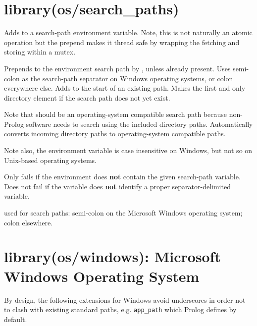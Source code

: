 \chapter{library(os/search_paths)}\label{sec:searchpaths}

\begin{description}
Adds  to a search-path environment variable. Note, this is
not naturally an atomic operation but the prepend makes it thread
safe by wrapping the fetching and storing within a mutex.

Prepends  to the environment search path by , unless
already present. Uses semi-colon as the search-path separator on
Windows operating systems, or colon everywhere else. Adds 
to the start of an existing path. Makes  the first and only
directory element if the search path does not yet exist.

Note that  should be an operating-system compatible search
path because non-Prolog software needs to search using the included
directory paths. Automatically converts incoming directory paths to
operating-system compatible paths.

Note also, the environment variable  is case insensitive on
Windows, but not so on Unix-based operating systems.

\nodescription
Only fails if the environment does \textbf{not} contain the given
search-path variable. Does not fail if the variable does \textbf{not}
identify a proper separator-delimited variable.

 used for search paths: semi-colon on the Microsoft Windows
operating system; colon elsewhere.
\end{description}

\chapter{library(os/windows): Microsoft Windows Operating System}\label{sec:windows}

By design, the following extensions for Windows avoid underscores
in order not to clash with existing standard paths, e.g. \verb$app_path$
which Prolog defines by default.

